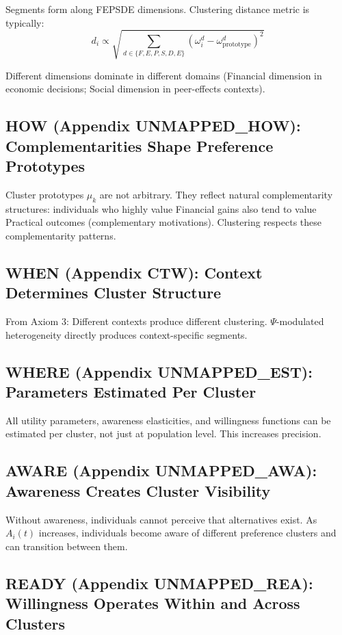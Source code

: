 Segments form along FEPSDE dimensions. Clustering distance metric is typically:
\begin{equation}
d_i \propto \sqrt{\sum_{d \in \{F,E,P,S,D,E\}} (\omega^d_i - \omega^d_{\text{prototype}})^2}
\end{equation}

Different dimensions dominate in different domains (Financial dimension in
economic decisions; Social dimension in peer-effects contexts).
\cite{fehr1999theory, fehr2002cooperation}

\subsection{HOW (Appendix UNMAPPED_HOW): Complementarities Shape Preference Prototypes}

Cluster prototypes $\mu_k$ are not arbitrary. They reflect natural complementarity
structures: individuals who highly value Financial gains also tend to value
Practical outcomes (complementary motivations). Clustering respects these
complementarity patterns.

\subsection{WHEN (Appendix CTW): Context Determines Cluster Structure}

From Axiom 3: Different contexts produce different clustering. $\Psi$-modulated
heterogeneity directly produces context-specific segments.

\subsection{WHERE (Appendix UNMAPPED_EST): Parameters Estimated Per Cluster}

All utility parameters, awareness elasticities, and willingness functions can
be estimated per cluster, not just at population level. This increases precision.

\subsection{AWARE (Appendix UNMAPPED_AWA): Awareness Creates Cluster Visibility}

Without awareness, individuals cannot perceive that alternatives exist. As
$A_i(t)$ increases, individuals become aware of different preference clusters
and can transition between them.

\subsection{READY (Appendix UNMAPPED_REA): Willingness Operates Within and Across Clusters}


